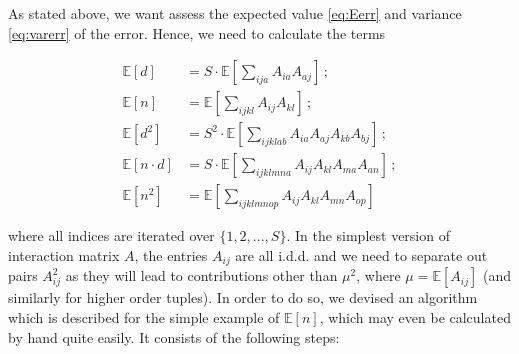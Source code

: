 \documentclass[10pt]{article}
\begin{document}
As stated above, we want assess the expected value \autoref{eq:Eerr} 
and variance \autoref{eq:varerr} of the error. Hence, we need to calculate the terms

\begin{align}
    \mathbb{E}[d]         &= S \cdot \mathbb{E}\left[ \sum_{ija} A_{ia}A_{aj} \right] \,; \\ 
    \mathbb{E}[n]         &= \mathbb{E} \left[ \sum_{ijkl} A_{ij}A_{kl} \right]  \,;   \\ 
    \mathbb{E}[d^2]       &= S^2 \cdot \mathbb{E} \left[ \sum_{ijklab} A_{ia}A_{aj}A_{kb}A_{bj} \right]  \,;   \\
    \mathbb{E}[n \cdot d] &= S \cdot \mathbb{E} \left[ \sum_{ijklmna} A_{ij}A_{kl}A_{ma}A_{an} \right]  \,;  \\
    \mathbb{E}[n^2]       &= \mathbb{E} \left[ \sum_{ijklmnop} A_{ij}A_{kl}A_{mn}A_{op} \right]   
\end{align}

where all indices are iterated over $\{1, 2, ..., S\}$. In the simplest version of interaction matrix $A$, 
the entries $A_{ij}$ are all i.d.d. and we need to separate out pairs $A_{ij}^2$ as they will lead to contributions 
other than $\mu^2$, where $\mu = \mathbb{E}[A_{ij}]$ (and similarly for higher order tuples).
In order to do so, we devised an algorithm which is described for the simple example of $\mathbb{E}[n]$, 
which may even be calculated by hand quite easily. It consists of the following steps: 
\end{document}
